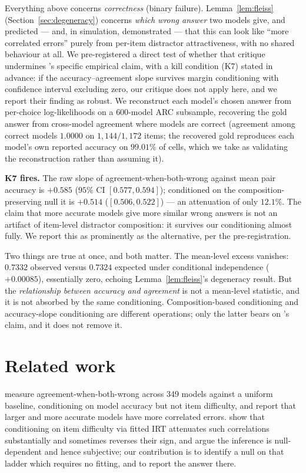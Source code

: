 \documentclass[pdflatex,sn-mathphys-ay]{sn-jnl}
\theoremstyle{thmstyleone}
\theoremstyle{thmstylethree}
\begin{document}
Everything above concerns \emph{correctness} (binary failure). Lemma~\ref{lem:fleiss}
(Section~\ref{sec:degeneracy}) concerns \emph{which wrong answer} two models give, and predicted
--- and, in simulation, demonstrated --- that this can look like ``more correlated errors''
purely from per-item distractor attractiveness, with no shared behaviour at all. We pre-registered a direct
test of whether that critique undermines \citet{kim2025correlated}'s specific empirical claim,
with a kill condition (K7) stated in advance: if the accuracy--agreement slope survives margin
conditioning with confidence interval excluding zero, our critique does not apply here, and we
report their finding as robust. We reconstruct each model's chosen answer from per-choice
log-likelihoods on a $600$-model ARC subsample, recovering the gold answer from cross-model
agreement where models are correct (agreement among correct models $1.0000$ on $1{,}144/1{,}172$
items; the recovered gold reproduces each model's own reported accuracy on $99.01\%$ of cells,
which we take as validating the reconstruction rather than assuming it).

\textbf{K7 fires.} The raw slope of agreement-when-both-wrong against mean pair accuracy is
$+0.585$ ($95\%$ CI $[0.577, 0.594]$); conditioned on the composition-preserving null it is
$+0.514$ ($[0.506, 0.522]$) --- an attenuation of only $12.1\%$. The claim that more accurate
models give more similar wrong answers is not an artifact of item-level distractor composition:
it survives our conditioning almost fully. We report this as prominently as the alternative,
per the pre-registration.

Two things are true at once, and both matter. The mean-level excess vanishes:
$0.7332$ observed versus $0.7324$ expected under conditional independence
($+0.00085$), essentially zero, echoing Lemma~\ref{lem:fleiss}'s degeneracy result. But the
\emph{relationship between accuracy and agreement} is not a mean-level statistic, and it is not
absorbed by the same conditioning. Composition-based conditioning and accuracy-slope
conditioning are different operations; only the latter bears on \citeauthor{kim2025correlated}'s
claim, and it does not remove it.

\section{Related work}

\citet{kim2025correlated} measure agreement-when-both-wrong across 349 models against a uniform
baseline, conditioning on model accuracy but not item difficulty, and report that larger and more
accurate models have more correlated errors. \citet{jo2026subjectivity} show that conditioning on
item difficulty via fitted IRT attenuates such correlations substantially and sometimes reverses
their sign, and argue the inference is null-dependent and hence subjective; our contribution is
to identify a null on that ladder which requires no fitting, and to report the answer there.
\end{document}

